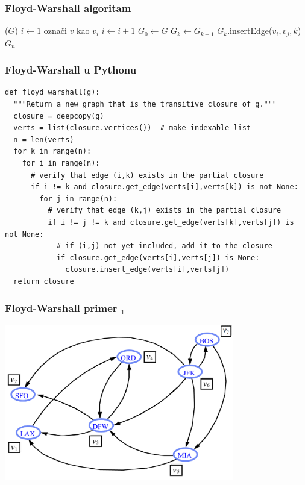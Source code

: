 \documentclass[compress,aspectratio=169]{beamer}
\begin{document}
\begin{frame}[fragile,shrink=10]
  \frametitle{Floyd-Warshall algoritam}
  \begin{algorithmic}
    \STATE {}($G$)
    \STATE $i \leftarrow 1$
      \STATE označi $v$ kao $v_{i}$
      \STATE $i \leftarrow i+1$
    \ENDFOR
    \STATE $G_{0} \leftarrow G$
      \STATE $G_{k} \leftarrow G_{k-1}$
              \STATE $G_{k}$.insertEdge($v_{i},v_{j},k$)
            \ENDIF
          \ENDIF
        \ENDFOR
      \ENDFOR
    \ENDFOR
    \RETURN $G_{n}$
  \end{algorithmic}
\end{frame}

\begin{frame}[fragile,shrink=23]
  \frametitle{Floyd-Warshall u Pythonu}
\begin{verbatim}
def floyd_warshall(g):
  """Return a new graph that is the transitive closure of g."""
  closure = deepcopy(g)
  verts = list(closure.vertices())  # make indexable list
  n = len(verts)
  for k in range(n):
    for i in range(n):
      # verify that edge (i,k) exists in the partial closure
      if i != k and closure.get_edge(verts[i],verts[k]) is not None:
        for j in range(n):
          # verify that edge (k,j) exists in the partial closure
          if i != j != k and closure.get_edge(verts[k],verts[j]) is not None:
            # if (i,j) not yet included, add it to the closure
            if closure.get_edge(verts[i],verts[j]) is None:
              closure.insert_edge(verts[i],verts[j])
  return closure
\end{verbatim}
\end{frame}

\begin{frame}[fragile]
  \frametitle{Floyd-Warshall primer $_1$}
  \begin{center}
    \includegraphics[width=10cm]{asp-14-pic37.png}
  \end{center}
\end{frame}
\end{document}
